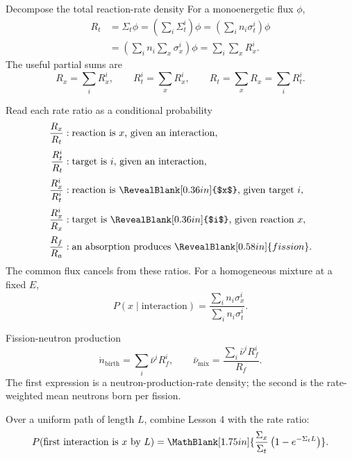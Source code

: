 \newpage
\begin{handoutcolumns}


\begin{fixedbox}{Decompose the total reaction-rate density}
For a monoenergetic flux $\phi$,
\[
\begin{aligned}
 R_t
 &=\Sigma_t\phi
  =\left(\sum_i\Sigma_t^i\right)\phi
  =\left(\sum_i n_i\sigma_t^i\right)\phi \\
 &=\left(\sum_i n_i\sum_x\sigma_x^i\right)\phi
  =\sum_i\sum_x R_x^i.
\end{aligned}
\]
The useful partial sums are
\[
 R_x=\sum_iR_x^i,
 \qquad
 R_t^i=\sum_xR_x^i,
 \qquad
 R_t=\sum_xR_x=\sum_iR_t^i.
\]
\end{fixedbox}

\begin{boardbox}{Read each rate ratio as a conditional probability}
\footnotesize
\begin{align*}
 \frac{R_x}{R_t}
   &: \text{reaction is }x\text{, given an interaction},\\[2pt]
 \frac{R_t^i}{R_t}
   &: \text{target is }i\text{, given an interaction},\\[2pt]
 \frac{R_x^i}{R_t^i}
   &: \text{reaction is }\RevealBlank[0.36in]{$x$}\text{, given target }i,\\[2pt]
 \frac{R_x^i}{R_x}
   &: \text{target is }\RevealBlank[0.36in]{$i$}\text{, given reaction }x,\\[2pt]
 \frac{R_f}{R_a}
   &: \text{an absorption produces }\RevealBlank[0.58in]{fission}.
\end{align*}
The common flux cancels from these ratios. For a homogeneous mixture at a
fixed $E$,
\[
 \boxed{P(x\mid\text{interaction})
 =\frac{\sum_i n_i\sigma_x^i}{\sum_i n_i\sigma_t^i}}.
\]
\normalsize
\end{boardbox}

\begin{fixedbox}{Fission-neutron production}
\[
 \dot n_{\mathrm{birth}}=\sum_i\bar\nu^iR_f^i,
 \qquad
 \bar\nu_{\mathrm{mix}}
 =\frac{\sum_i\bar\nu^iR_f^i}{R_f}.
\]
The first expression is a neutron-production-rate density; the second is the
rate-weighted mean neutrons born per fission.
\end{fixedbox}

\begin{checkpoint}
Over a uniform path of length $L$, combine Lesson 4 with the rate ratio:
\[
 P(\text{first interaction is }x\text{ by }L)
 =\MathBlank[1.75in]{\frac{\Sigma_x}{\Sigma_t}
   \left(1-e^{-\Sigma_tL}\right)}.
\]
\end{checkpoint}


\end{handoutcolumns}
